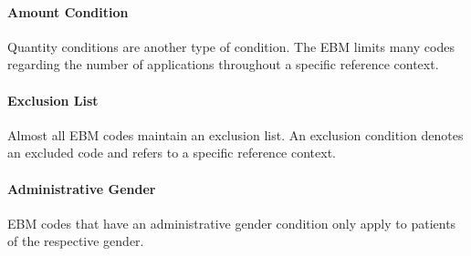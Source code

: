\paragraph{Amount Condition}\label{par:amount-condition}
Quantity conditions are another type of condition.
The EBM limits many codes regarding the number of applications throughout a specific reference context.

\paragraph{Exclusion List}\label{par:exclusion-list}
Almost all EBM codes maintain an exclusion list.
An exclusion condition denotes an excluded code and refers to a specific reference context.

\paragraph{Administrative Gender}\label{par:administrative-gender}
EBM codes that have an administrative gender condition only apply to patients of the respective gender.


%

